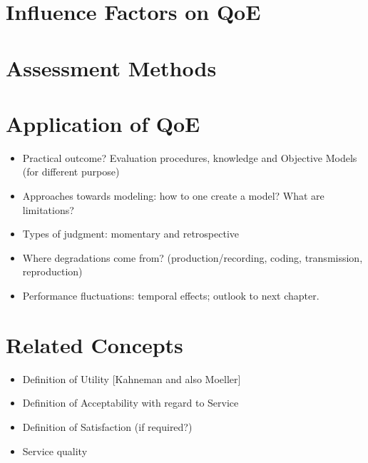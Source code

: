 \section{Influence Factors on \ac{QoE}} %

\section{Assessment Methods}






\section{Application of {QoE}}
\begin{itemize}
\item Practical outcome? Evaluation procedures, knowledge and Objective Models (for different purpose)
\item Approaches towards modeling: how to one create a model? What are limitations?
\item Types of judgment: momentary and retrospective
\item Where degradations come from? (production/recording, coding, transmission, reproduction)
\item Performance fluctuations: temporal effects; outlook to next chapter.
\end{itemize}

\section{Related Concepts}
\begin{itemize}
\item Definition of Utility [Kahneman and also Moeller]
\item Definition of Acceptability with regard to Service
\item Definition of Satisfaction (if required?)
\item Service quality
\end{itemize}
